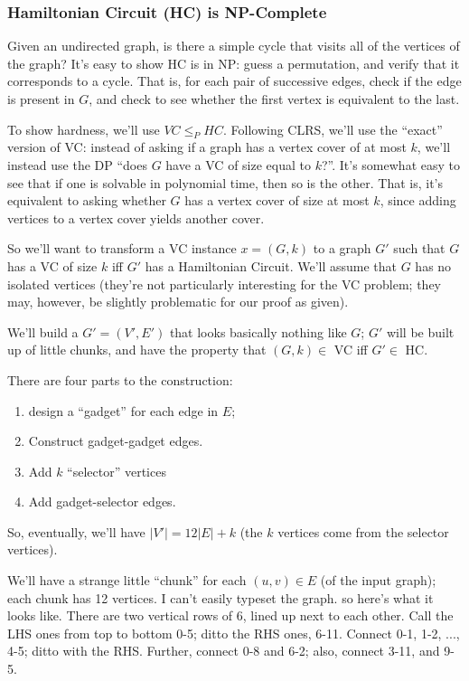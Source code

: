 \documentclass{article}
\begin{document}
\subsubsection{Hamiltonian Circuit (HC) is NP-Complete}

Given an undirected graph, is there a simple cycle that visits all of the
vertices of the graph?
It's easy to show HC is in NP: guess a permutation, and verify that it 
corresponds to a cycle.
That is, for each pair of successive edges, check if the edge is present in
$G$, and check to see whether the first vertex is equivalent to the last.

To show hardness, we'll use $VC \leq_P HC$. Following CLRS, we'll
use the ``exact'' version of VC: instead of asking if a graph has a vertex
cover of at most $k$, we'll instead use the DP ``does $G$ have a VC
of size equal to $k$?''. 
It's somewhat easy to see that if one is solvable
in polynomial time, then so is the other.
That is, it's equivalent to asking whether $G$ has a vertex cover of size at 
most $k$, since
adding vertices to a vertex cover yields another cover.

So we'll want to transform a VC instance $x = (G,k)$ to a graph $G'$
such that $G$ has a VC of size $k$ iff $G'$ has a Hamiltonian Circuit.
We'll assume that $G$ has no isolated vertices (they're not particularly
interesting for the VC problem; they may, however, be slightly problematic
for our proof as given).

We'll build a $G' = (V', E')$ that looks basically nothing like $G$; 
$G'$ will be built up of little chunks, and have the property that 
$(G,k) \in $ VC iff $G' \in$ HC.

There are four parts to the construction: 
\begin{enumerate}
\item design a ``gadget'' for each
edge in $E$; 
\item
Construct gadget-gadget edges.
\item
Add $k$ ``selector'' vertices
\item
Add gadget-selector edges.
\end{enumerate}
So, eventually, we'll have $|V'| = 12|E| + k$ (the $k$ vertices come from
the selector vertices).

We'll have a strange little ``chunk'' for each $(u,v)\in E$ (of the
input graph); each chunk has 12 vertices.
I can't easily typeset the graph. so here's what it looks like.
There are two vertical rows of 6, lined up next to each other. Call the LHS
ones from top to bottom 0-5; ditto the RHS ones, 6-11.
Connect 0-1, 1-2, ..., 4-5; ditto with the RHS.
Further, connect 0-8 and 6-2; also, connect 3-11, and 9-5.
\end{document}
